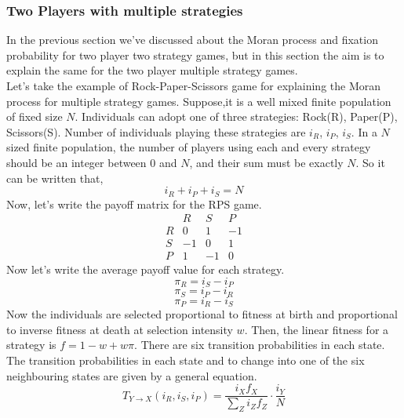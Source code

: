\documentclass{article}
\begin{document}
\subsubsection{Two Players with multiple strategies}
In the previous section we've discussed about the Moran process and fixation probability for  two player two strategy games,
but in this section the aim is to explain the same for the two player multiple strategy games.\\
Let's take the example of Rock-Paper-Scissors game for explaining the Moran process for multiple strategy games.
Suppose,it is a well mixed finite population of fixed size $N$.
Individuals can adopt one of three strategies: Rock(R), Paper(P), Scissors(S).
Number of individuals playing these strategies are $i_R$, $i_P$, $i_S$.
In a $N$ sized finite population, the number of players using each and every strategy should be an integer between $0$ and $N$, and their sum must be exactly $N$. So it can be written that,
\begin{equation}
i_R+i_P+i_S = N \label{eq:35}
\end{equation}
Now, let's write the payoff matrix for the RPS game.
\begin{equation}
\begin{array}{c|ccc}
  & R & S & P \\ \hline
R & 0 & 1 & -1 \\
S & -1 & 0 & 1 \\
P & 1 & -1 & 0
\end{array} \label{eq:36}
\end{equation}
Now let's write the average payoff value for each strategy.
\begin{equation}
\pi_R= i_S - i_P \label{eq:37}
\end{equation}
\begin{equation}
\pi_S= i_P - i_R \label{eq:38}
\end{equation}
\begin{equation}
\pi_P= i_R - i_S \label{eq:39}
\end{equation}
Now the individuals are selected proportional to fitness at birth and proportional to inverse  fitness at death at selection intensity $w$.
Then, the linear fitness for a strategy is $f=1-w+w\pi$.
There are six transition probabilities in each state.
The transition probabilities in each state and to change into one of the six neighbouring states are given by a general equation.
\begin{equation}
T_{Y \to X}(i_R,i_S,i_P)= \frac{i_X f_X}{\sum_Z i_Z f_Z} \cdot \frac{i_Y}{N} \label{eq:40}
\end{equation}
\end{document}
